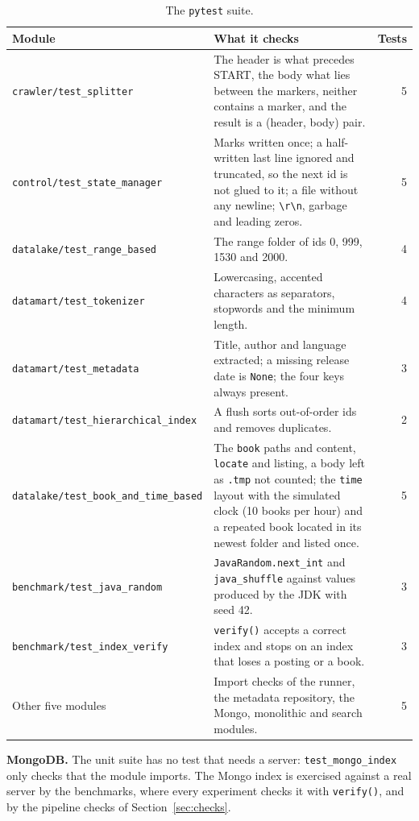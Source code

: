 \documentclass[11pt,a4paper]{article}
\newcommand{\code}[1]{\texttt{#1}}
\begin{document}
\begin{table}[H]
\centering\small
\begin{tabularx}{\linewidth}{@{}l Y r@{}}
\toprule
Module & What it checks & Tests \\
\midrule
\code{crawler/test\_splitter} & The header is what precedes START, the body what lies between the markers, neither contains a marker, and the result is a (header, body) pair. & 5 \\
\code{control/test\_state\_manager} & Marks written once; a half-written last line ignored and truncated, so the next id is not glued to it; a file without any newline; \code{\textbackslash r\textbackslash n}, garbage and leading zeros. & 5 \\
\code{datalake/test\_range\_based} & The range folder of ids 0, 999, 1530 and 2000. & 4 \\
\code{datamart/test\_tokenizer} & Lowercasing, accented characters as separators, stopwords and the minimum length. & 4 \\
\code{datamart/test\_metadata} & Title, author and language extracted; a missing release date is \code{None}; the four keys always present. & 3 \\
\code{datamart/test\_hierarchical\_index} & A flush sorts out-of-order ids and removes duplicates. & 2 \\
\code{datalake/test\_book\_and\_time\_based} & The \code{book} paths and content, \code{locate} and listing, a body left as \code{.tmp} not counted; the \code{time} layout with the simulated clock (10 books per hour) and a repeated book located in its newest folder and listed once. & 5 \\
\code{benchmark/test\_java\_random} & \code{JavaRandom.next\_int} and \code{java\_shuffle} against values produced by the JDK with seed 42. & 3 \\
\code{benchmark/test\_index\_verify} & \code{verify()} accepts a correct index and stops on an index that loses a posting or a book. & 3 \\
Other five modules & Import checks of the runner, the metadata repository, the Mongo, monolithic and search modules. & 5 \\
\bottomrule
\end{tabularx}
\caption{The \code{pytest} suite.}
\end{table}

\textbf{MongoDB.} The unit suite has no test that needs a server: \code{test\_mongo\_index} only
checks that the module imports. The Mongo index is exercised against a real server by the
benchmarks, where every experiment checks it with \code{verify()}, and by the pipeline checks of
Section~\ref{sec:checks}.
\end{document}
